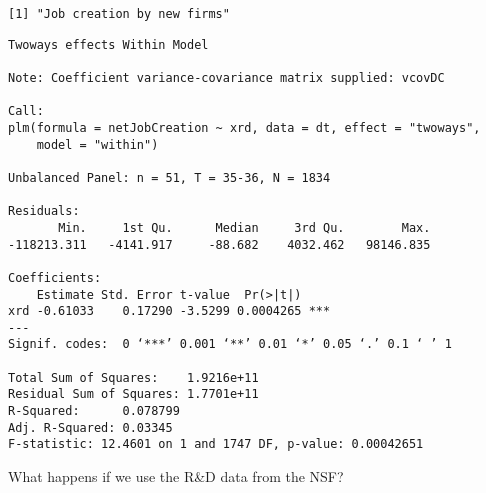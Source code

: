 \documentclass[11pt]{article}
\begin{document}
    
    \begin{Verbatim}[commandchars=\\\{\}]
[1] "Job creation by new firms"

    \end{Verbatim}

    
    \begin{verbatim}
Twoways effects Within Model

Note: Coefficient variance-covariance matrix supplied: vcovDC

Call:
plm(formula = netJobCreation ~ xrd, data = dt, effect = "twoways", 
    model = "within")

Unbalanced Panel: n = 51, T = 35-36, N = 1834

Residuals:
       Min.     1st Qu.      Median     3rd Qu.        Max. 
-118213.311   -4141.917     -88.682    4032.462   98146.835 

Coefficients:
    Estimate Std. Error t-value  Pr(>|t|)    
xrd -0.61033    0.17290 -3.5299 0.0004265 ***
---
Signif. codes:  0 ‘***’ 0.001 ‘**’ 0.01 ‘*’ 0.05 ‘.’ 0.1 ‘ ’ 1

Total Sum of Squares:    1.9216e+11
Residual Sum of Squares: 1.7701e+11
R-Squared:      0.078799
Adj. R-Squared: 0.03345
F-statistic: 12.4601 on 1 and 1747 DF, p-value: 0.00042651
    \end{verbatim}

    
    What happens if we use the R\&D data from the NSF?
\end{document}
